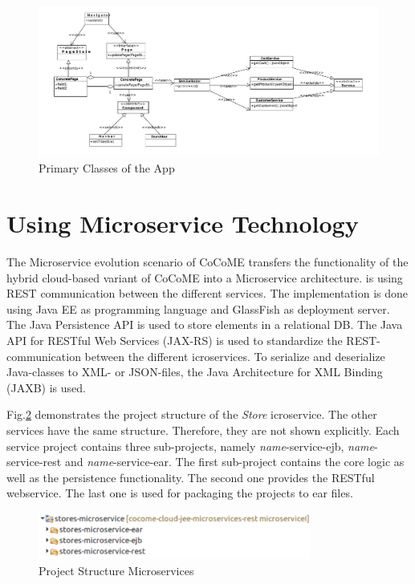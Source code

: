   
   \begin{figure}
  	\includegraphics[width=\textwidth]{img/appBasicClass.pdf}
  	\caption{Primary Classes of the App}
  	\label{App_ClassDiagram}
  \end{figure}

\FloatBarrier
 
 
 \section{Using Microservice Technology} \label{MicroserviceImplementation}
 The Microservice evolution scenario of CoCoME transfers the functionality of the hybrid cloud-based variant of CoCoME into a Microservice architecture.
  is using REST communication between the different services. 
 The implementation is done using Java EE as programming language and GlassFish as deployment server. 
 The Java Persistence API is used to store elements in a relational DB. 
 The Java API for RESTful Web Services (JAX-RS) is used to standardize the REST-communication between the different icroservices. 
 To serialize and deserialize Java-classes to XML- or JSON-files, the Java Architecture for XML Binding (JAXB) is used. 

 Fig.\added{~}\ref{projectStructure} demonstrates the project structure of the \textit{Store} icroservice. 
 The other services have the same structure. 
 Therefore, they are not shown explicitly.  
 Each service project contains three sub-projects, namely \textit{name}-service-ejb, \textit{name}-service-rest and \textit{name}-service-ear. 
 The first sub-project contains the core logic as well as the persistence functionality. 
 The second one provides the RESTful webservice. 
 The last one is used for packaging the projects to ear files. 
 
 	\begin{figure}[h]
		\centering
		\includegraphics[width = 0.8\textwidth] {img/projectStructure_Micro.pdf}
	 	\caption{Project Structure Microservices}
	 	\label{projectStructure}
	 	
 	\end{figure}
 	
